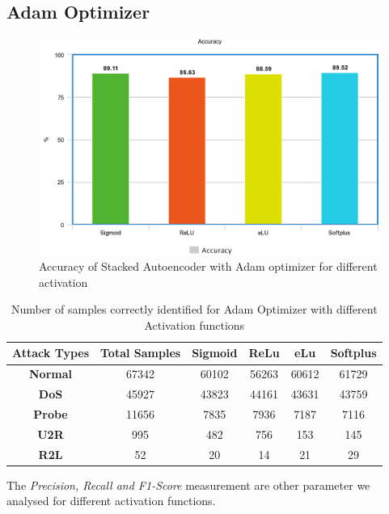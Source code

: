 \documentclass[12pt, a4paper]{report}
\begin{document}
\begin{appendices}
 \section{Adam Optimizer}
 \begin{figure}[h]
\centering
\captionsetup{justification=centering,margin=2cm}
\includegraphics[width=13cm]{accuracy_adam_tflearn.png}
\caption{ Accuracy of Stacked Autoencoder with Adam optimizer for different activation }
\label{fig:acc_adam}
\end{figure}


\begin{table}[h]
\centering
\captionsetup{justification=centering,margin=2cm}
\begin{tabular}{|c|c|c|c|c|c|}
\hline
\textbf{Attack Types} & \textbf{Total Samples} & \textbf{Sigmoid} & \textbf{ReLu} & \textbf{eLu} & \textbf{Softplus} \\ \hline
\textbf{Normal}       & 67342                  & 60102            & 56263         & 60612        & 61729             \\ \hline
\textbf{DoS}          & 45927                  & 43823            & 44161         & 43631        & 43759             \\ \hline
\textbf{Probe}        & 11656                  & 7835             & 7936          & 7187         & 7116              \\ \hline
\textbf{U2R}          & 995                    & 482              & 756           & 153          & 145               \\ \hline
\textbf{R2L}          & 52                     & 20               & 14            & 21           & 29                \\ \hline
\end{tabular}
\caption{Number of samples correctly identified for Adam Optimizer with different Activation functions}
\label{confusion_adam_tflearn}
\end{table}
\clearpage
  The \textit{Precision, Recall and F1-Score} measurement are other parameter we analysed for different activation functions. \\ \par

\end{appendices}
\end{document}
